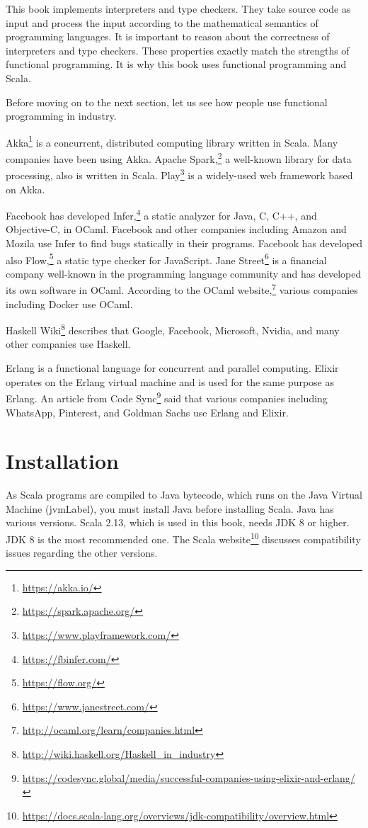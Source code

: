 This book implements interpreters and type checkers. They take source code as
input and process the input according to the mathematical semantics of programming
languages. It is important
to reason about the correctness of interpreters and type checkers. These
properties exactly match the strengths of functional programming. It is why
this book uses functional programming and Scala.

Before moving on to the next section,
let us see how people use functional programming in industry.

Akka\footnote{\url{https://akka.io/}} is a concurrent,
distributed computing library written in Scala. Many companies have been using Akka.
Apache Spark,\footnote{\url{https://spark.apache.org/}} a well-known library for data
processing, also is written in Scala.
Play\footnote{\url{https://www.playframework.com/}}
is a widely-used web framework based on Akka.

Facebook has developed Infer,\footnote{\url{https://fbinfer.com/}} a static analyzer for Java,
C, C++, and Objective-C, in OCaml. Facebook and other companies including Amazon
and Mozila use Infer to find bugs statically in their programs. Facebook has
developed also Flow,\footnote{\url{https://flow.org/}} a static type checker for JavaScript.
Jane Street\footnote{\url{https://www.janestreet.com/}} is a financial company well-known in
the programming language community and has developed its own software in OCaml.
According to the OCaml website,\footnote{\url{http://ocaml.org/learn/companies.html}}
various companies including Docker use OCaml.

Haskell Wiki\footnote{\url{http://wiki.haskell.org/Haskell_in_industry}} describes that Google,
Facebook, Microsoft, Nvidia, and many other companies use Haskell.

Erlang is a functional language for concurrent and parallel computing. Elixir
operates on the Erlang virtual machine and is used for the same purpose as Erlang.
An article from Code
Sync\footnote{\url{https://codesync.global/media/successful-companies-using-elixir-and-erlang/}}
said that various companies including WhatsApp, Pinterest, and Goldman Sachs
use Erlang and Elixir.

\section{Installation}

As Scala programs are compiled to Java bytecode, which runs on the Java Virtual
Machine (\acrshort{jvmLabel}), you must
install Java before installing Scala. Java has various versions. Scala 2.13,
which is used in this book, needs JDK 8 or higher. JDK 8 is the most recommended
one. The Scala website\footnote{\url{https://docs.scala-lang.org/overviews/jdk-compatibility/overview.html}}
discusses compatibility issues regarding the other versions.

